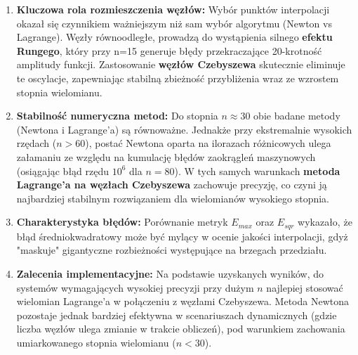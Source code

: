 \documentclass{article}
\begin{document}
\begin{enumerate}
\item \textbf{Kluczowa rola rozmieszczenia węzłów:} Wybór punktów interpolacji okazał się czynnikiem ważniejszym niż sam wybór algorytmu (Newton vs Lagrange).
Węzły równoodległe, prowadzą do wystąpienia silnego \textbf{efektu Rungego}, który przy n=15 generuje błędy przekraczające
20-krotność amplitudy funkcji. Zastosowanie \textbf{węzłów Czebyszewa} skutecznie eliminuje te oscylacje, zapewniając stabilną zbieżność przybliżenia wraz ze
wzrostem stopnia wielomianu.

\item \textbf{Stabilność numeryczna metod:} Do stopnia $n \approx 30$ obie badane metody (Newtona i Lagrange'a) są równoważne. Jednakże przy
ekstremalnie wysokich rzędach ($n > 60$), postać Newtona oparta na ilorazach różnicowych ulega załamaniu ze względu na kumulację błędów zaokrągleń maszynowych
(osiągając błąd rzędu $10^6$ dla $n=80$). W tych samych warunkach \textbf{metoda Lagrange'a na węzłach Czebyszewa} zachowuje precyzję, co czyni ją najbardziej stabilnym rozwiązaniem dla wielomianów wysokiego stopnia.

\item \textbf{Charakterystyka błędów:} Porównanie metryk $E_{max}$ oraz $E_{sqr}$ wykazało, że błąd średniokwadratowy może być mylący w ocenie jakości interpolacji,
gdyż "maskuje" gigantyczne rozbieżności występujące na brzegach przedziału.

\item \textbf{Zalecenia implementacyjne:} Na podstawie uzyskanych wyników, do systemów wymagających wysokiej precyzji przy dużym $n$ najlepiej stosować
wielomian Lagrange'a w połączeniu z węzłami Czebyszewa. Metoda Newtona pozostaje jednak bardziej efektywna w scenariuszach dynamicznych
(gdzie liczba węzłów ulega zmianie w trakcie obliczeń), pod warunkiem zachowania umiarkowanego stopnia wielomianu ($n < 30$).

\end{enumerate}
\end{document}
